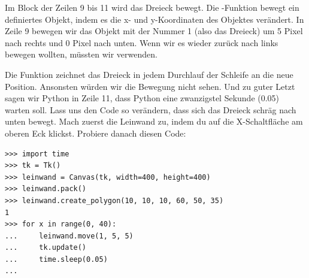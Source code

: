 Im Block der Zeilen 9 bis 11 wird das Dreieck bewegt. Die -Funktion bewegt ein definiertes Objekt, indem es die x- und y-Koordinaten des Objektes verändert. In Zeile 9 bewegen wir das Objekt mit der Nummer 1 (also das Dreieck) um 5 Pixel nach rechts und 0 Pixel nach unten. Wenn wir es wieder zurück nach links bewegen wollten, müssten wir  verwenden.

Die Funktion  zeichnet das Dreieck in jedem Durchlauf der Schleife an die neue Position. Ansonsten würden wir die Bewegung nicht sehen. Und zu guter Letzt sagen wir Python in Zeile 11, dass Python eine zwanzigstel Sekunde (0.05) warten soll. Lass uns den Code so verändern, dass sich das Dreieck schräg nach unten bewegt. Mach zuerst die Leinwand zu, indem du auf die X-Schaltfläche am oberen Eck klickst. Probiere danach diesen Code:

\begin{Verbatim}[frame=single]
>>> import time
>>> tk = Tk()
>>> leinwand = Canvas(tk, width=400, height=400)
>>> leinwand.pack()
>>> leinwand.create_polygon(10, 10, 10, 60, 50, 35)
1
>>> for x in range(0, 40):
...     leinwand.move(1, 5, 5)
...     tk.update()
...     time.sleep(0.05)
...
\end{Verbatim}

